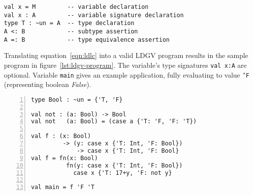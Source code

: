 \begin{lstlisting}[float,language=ldgv,
  caption={Statements in LDGV, with expression \texttt{M} and types \texttt{A,B}},
  label=lst:ldgv-statements]
val x = M         -- variable declaration
val x : A         -- variable signature declaration
type T : ~un = A  -- type declaration
A <: B            -- subtype assertion
A =: B            -- type equivalence assertion
\end{lstlisting}

Translating equation~\ref{eqn:ldlc} into a valid LDGV program results in the sample program in figure~\ref{lst:ldgv-program}. The variable's type signatures \texttt{val x:A} are optional.
Variable \texttt{main} gives an example application, fully evaluating to value \texttt{'F} (representing boolean \emph{False}).

\begin{lstlisting}[float,language=ldgv,numbers=left,
  caption=Sample LDGV program,
  label=lst:ldgv-program]
type Bool : ~un = {'T, 'F}

val not : (a: Bool) -> Bool
val not   (a: Bool) = (case a {'T: 'F, 'F: 'T})

val f : (x: Bool)
         -> (y: case x {'T: Int, 'F: Bool})
             -> case x {'T: Int, 'F: Bool}
val f = fn(x: Bool)
          fn(y: case x {'T: Int, 'F: Bool})
            case x {'T: 17+y, 'F: not y}

val main = f 'F 'T
\end{lstlisting}
